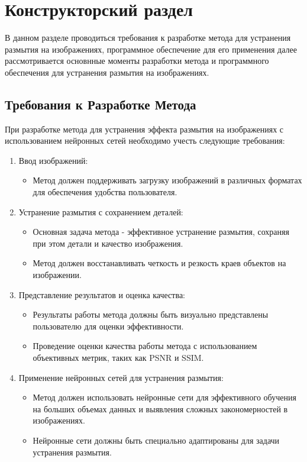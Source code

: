 \chapter{Конструкторский раздел}

В данном разделе проводиться требования к разработке метода для устранения размытия на изображениях, программное обеспечение для его применения далее рассмотривается основнные моменты разработки метода и программного обеспечения для устранения размытия на изображениях.

\section{Требования к Разработке Метода}

При разработке метода для устранения эффекта размытия на изображениях с использованием нейронных сетей необходимо учесть следующие требования:

\begin{enumerate}
    \item Ввод изображений:
    \begin{itemize}
        \item Метод должен поддерживать загрузку изображений в различных форматах для обеспечения удобства пользователя.
    \end{itemize}

    \item Устранение размытия с сохранением деталей:
    \begin{itemize}
        \item Основная задача метода - эффективное устранение размытия, сохраняя при этом детали и качество изображения.
        \item Метод должен восстанавливать четкость и резкость краев объектов на изображении.
    \end{itemize}

    \item Представление результатов и оценка качества:
    \begin{itemize}
        \item Результаты работы метода должны быть визуально представлены пользователю для оценки эффективности.
        \item Проведение оценки качества работы метода с использованием объективных метрик, таких как PSNR и SSIM.
    \end{itemize}

    \item Применение нейронных сетей для устранения размытия:
    \begin{itemize}
        \item Метод должен использовать нейронные сети для эффективного обучения на больших объемах данных и выявления сложных закономерностей в изображениях.
        \item Нейронные сети должны быть специально адаптированы для задачи устранения размытия.
    \end{itemize}
\end{enumerate}

